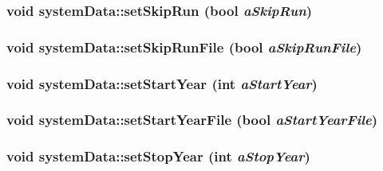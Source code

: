 \label{classsystem_data_a97e7e9ac45009f3d1afcd103c70a15ab}
\hypertarget{classsystem_data_a5adb28039eb1e457814248bcc6f7cdad}{
\subsubsection[{setSkipRun}]{\setlength{\rightskip}{0pt plus 5cm}void systemData::setSkipRun (bool {\em aSkipRun})}}
\label{classsystem_data_a5adb28039eb1e457814248bcc6f7cdad}
\hypertarget{classsystem_data_a6d5a723d4d137740497fe8e054cb1a54}{
\subsubsection[{setSkipRunFile}]{\setlength{\rightskip}{0pt plus 5cm}void systemData::setSkipRunFile (bool {\em aSkipRunFile})}}
\label{classsystem_data_a6d5a723d4d137740497fe8e054cb1a54}
\hypertarget{classsystem_data_a49021c2a467fe79d13de7cd89231309a}{
\subsubsection[{setStartYear}]{\setlength{\rightskip}{0pt plus 5cm}void systemData::setStartYear (int {\em aStartYear})}}
\label{classsystem_data_a49021c2a467fe79d13de7cd89231309a}
\hypertarget{classsystem_data_a9fc437c9ce5650ec41a06d08cad09b91}{
\subsubsection[{setStartYearFile}]{\setlength{\rightskip}{0pt plus 5cm}void systemData::setStartYearFile (bool {\em aStartYearFile})}}
\label{classsystem_data_a9fc437c9ce5650ec41a06d08cad09b91}
\hypertarget{classsystem_data_a603a6ff137421abe95aba9b553103235}{
\subsubsection[{setStopYear}]{\setlength{\rightskip}{0pt plus 5cm}void systemData::setStopYear (int {\em aStopYear})}}
